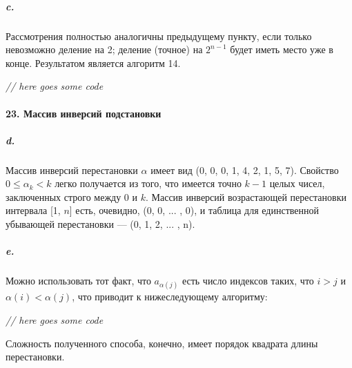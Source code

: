 \documentclass{../../template/mai_book}
\begin{document}
\subparagraph{c.} Рассмотрения полностью аналогичны предыдущему пункту, если
только невозможно деление на 2; деление (точное) на $2^{n - 1}$ будет иметь
место уже в конце. Результатом является алгоритм 14. \newline

\textit{// here goes some code}

\paragraph{23. Массив инверсий подстановки}

\subparagraph{d.} Массив инверсий перестановки $\alpha$ имеет вид (0, 0, 0, 1, 4, 2, 1, 5, 7). Свойство $0 \leq \alpha_k < k$ легко получается из того, что имеется точно $k - 1$ целых чисел, заключенных строго между 0 и $k$. Массив инверсий возрастающей перестановки интервала [1, $n$] есть, очевидно, (0, 0, ... , 0), и таблица для единственной убывающей перестановки —  (0, 1, 2, ... , n).

\subparagraph{e.} Можно использовать тот факт, что $a_{\alpha(j)}$ есть число индексов таких, что $i > j$ и $\alpha(i) < \alpha(j)$, что приводит к нижеследующему алгоритму: \newline

\textit{// here goes some code} \newline

Сложность полученного способа, конечно, имеет порядок квадрата длины перестановки.

\pagebreak
\end{document}
